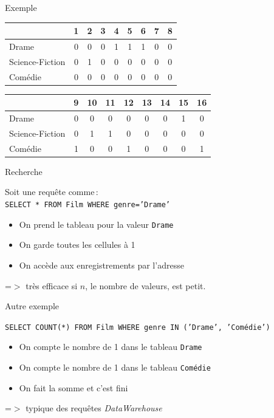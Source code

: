 \begin{frame}{Exemple}

\begin{center}
\begin{tabular}{|l|c|c|c|c|c|c|c|c|}
\hline
 & 1 & 2 & 3 & 4 & 5 & 6 & 7 & 8\\
\hline
Drame & 0 & 0 & 0 & 1 & 1 & 1 & 0 & 0 \\
Science-Fiction  & 0 & 1 & 0 & 0 & 0 & 0 & 0 & 0 \\
Comédie  & 0 & 0 & 0 & 0 & 0 & 0 & 0 & 0 \\
\hline
\end{tabular}

\begin{tabular}{|l|c|c|c|c|c|c|c|c|}
\hline
 & 9 & 10 & 11 & 12 & 13 & 14 & 15 & 16\\
\hline
Drame &  0 & 0 & 0 & 0 & 0 & 0 & 1 & 0\\
Science-Fiction  & 0 & 1 & 1 & 0 & 0 & 0 & 0 & 0\\
Comédie  &  1 & 0 & 0 & 1 & 0 & 0 & 0 & 1\\
\hline
\end{tabular}
\end{center}

\end{frame}
\begin{frame}{Recherche}

Soit une requête comme\,:\\
\texttt{SELECT * FROM Film WHERE genre='Drame'}

\begin{itemize}
  \item On prend le tableau pour la valeur \texttt{Drame}

   \item On garde toutes les cellules à 1

   \item On accède aux enregistrements par l'adresse
\end{itemize}

=$>$ très efficace si $n$, le nombre de valeurs, est petit.

\end{frame}
\begin{frame}{Autre exemple}

\texttt{SELECT COUNT(*) FROM   Film
WHERE  genre IN ('Drame', 'Comédie')}

\begin{itemize}
  \item On compte le nombre de 1 dans le tableau \texttt{Drame}
  \item On compte le nombre de 1 dans le tableau \texttt{Comédie}
   \item On fait la somme et c'est fini
\end{itemize}

=$>$ typique des requêtes \textit{DataWarehouse}

\end{frame}

